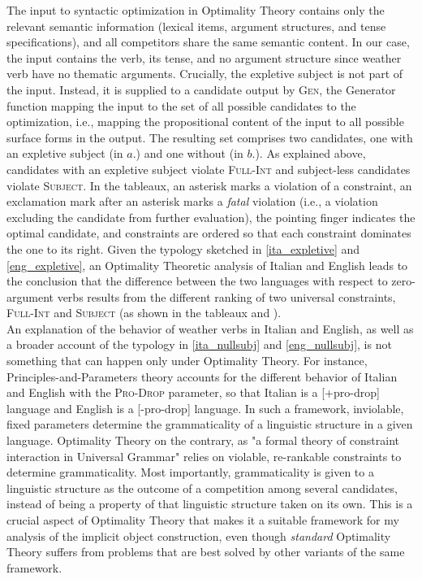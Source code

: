The input to syntactic optimization in Optimality Theory contains only the relevant semantic information (lexical items, argument structures, and tense specifications), and all competitors share the same semantic content. In our case, the input contains the verb, its tense, and no argument structure since weather verb have no thematic arguments. Crucially, the expletive subject is not part of the input. Instead, it is supplied to a candidate output by \textsc{Gen}, the Generator function mapping the input to the set of all possible candidates to the optimization, i.e., mapping the propositional content of the input to all possible surface forms in the output. The resulting set comprises two candidates, one with an expletive subject (in $a.$) and one without (in $b.$). As explained above, candidates with an expletive subject violate \textsc{Full-Int} and subject-less candidates violate \textsc{Subject}. In the tableaux, an asterisk marks a violation of a constraint, an exclamation mark after an asterisk marks a \textit{fatal} violation (i.e., a violation excluding the candidate from further evaluation), the pointing finger indicates the optimal candidate, and constraints are ordered so that each constraint dominates the one to its right. Given the typology sketched in \ref{ita_expletive} and \ref{eng_expletive}, an Optimality Theoretic analysis of Italian and English leads to the conclusion that the difference between the two languages with respect to zero-argument verbs results from the different ranking of two universal constraints, \textsc{Full-Int} and \textsc{Subject} (as shown in the tableaux   and ).\\
An explanation of the behavior of weather verbs in Italian and English, as well as a broader account of the typology in \ref{ita_nullsubj} and \ref{eng_nullsubj}, is not something that can happen only under Optimality Theory. For instance, Principles-and-Parameters theory accounts for the different behavior of Italian and English with the \textsc{Pro-Drop} parameter, so that Italian is a [+pro-drop] language and English is a [-pro-drop] language. In such a framework, inviolable, fixed parameters determine the grammaticality of a linguistic structure in a given language. Optimality Theory on the contrary, as "a formal theory of constraint interaction in Universal Grammar" \parencite{legendre2001introduction} relies on violable, re-rankable constraints to determine grammaticality. Most importantly, grammaticality is given to a linguistic structure as the outcome of a competition among several candidates, instead of being a property of that linguistic structure taken on its own. This is a crucial aspect of Optimality Theory that makes it a suitable framework for my analysis of the implicit object construction, even though \textit{standard} Optimality Theory suffers from problems that are best solved by other variants of the same framework. %
